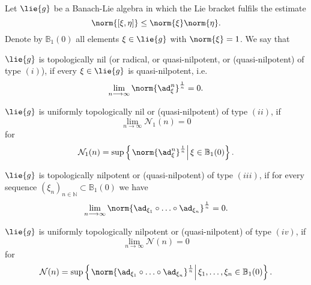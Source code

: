 \documentclass[
11pt,                          %
english                        %
]{article}
\begin{document}
\begin{definition}
	\label{def:nilpotencies}
	Let $\lie{g}$ be a Banach-Lie algebra in which the Lie bracket fulfils the 
	estimate
	\begin{equation*}
		\norm{ [\xi, \eta] }
		\leq
		\norm{\xi}
		\norm{\eta}.
	\end{equation*}
	Denote by $\mathbb{B}_1(0)$ all elements $\xi \in \lie{g}$ with 
	$\norm{\xi} = 1$. We say that
	\begin{definitionlist}
		\item
		$\lie{g}$ is topologically nil (or radical, or quasi-nilpotent, or 
		(quasi-nilpotent) of type $(i)$), if every $\xi \in \lie{g}$ is 
		quasi-nilpotent, i.e.
		\begin{equation*}
			\lim_{n \longrightarrow \infty}
			\norm{\ad_{\xi}^n}^{\frac{1}{n}}
			=
			0.
		\end{equation*}
		
		\item
		$\lie{g}$ is uniformly topologically nil or (quasi-nilpotent) of type 
		$(ii)$, if
		\begin{equation*}
			\lim_{n \longrightarrow \infty}
			\mathcal{N}_1(n)
			=
			0
		\end{equation*}
		for
		\begin{equation}
			\mathcal{N}_1(n)
			=
			\sup \left\{ 
			\left.
				\norm{ \ad_{\xi}^n}^{\frac{1}{n}} 
			\right|
				\xi \in \mathbb{B}_1(0)
			\right\}.
		\end{equation}
		
		\item
		$\lie{g}$ is topologically nilpotent or (quasi-nilpotent) of type 
		$(iii)$, if for every sequence
		$(\xi_n)_{n \in \mathbb{N}} \subset \mathbb{B}_1(0)$ we have
		\begin{equation*}
			\lim_{n \longrightarrow \infty}
			\norm{ 
				\ad_{\xi_1} \circ \ldots \circ \ad_{\xi_n}
			}^{\frac{1}{n}}
			=
			0.
		\end{equation*}
		
		\item
		$\lie{g}$ is uniformly topologically nilpotent or (quasi-nilpotent) of 
		type $(iv)$, if
		\begin{equation*}
			\lim_{n \longrightarrow \infty}
			\mathcal{N}(n)
			=
			0
		\end{equation*}
		for
		\begin{equation}
			\mathcal{N}(n)
			=
			\sup \left\{ 
			\left.
				\norm{ 
					\ad_{\xi_1} \circ \ldots \circ \ad_{\xi_n}
				}^{\frac{1}{n}} 
			\right|
				\xi_1, \ldots, \xi_n \in \mathbb{B}_1(0)
			\right\}.
		\end{equation}
	\end{definitionlist}
\end{definition}
\end{document}
